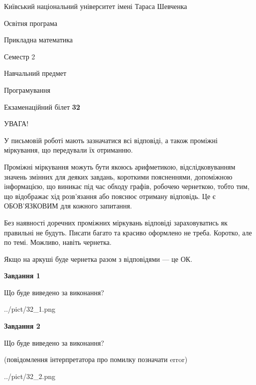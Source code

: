 \documentclass[12pt, ukrainian]{article}
\begin{document}
{{\begin {small}\par
{ \center  Київський національний університет імені Тараса Шевченка \par}
{\parbox {5 cm}{Освітня програма \hfill}{\parbox {7 cm}{Прикладна математика\hfill}}\parbox {6 cm}{\hfill Семестр 2}}\par
{\parbox {5 cm} {Навчальний предмет \hfill}\parbox {7 cm}{Програмування \hfill}\parbox {6cm}{\hfill}\par}\vspace{-7pt} \end{small}}{\center Екзаменаційний білет \No \textbf
{ 32 }\par}}
{
\begin {large}
УВАГА!

У письмовій роботі мають зазначатися всі відповіді, а також проміжні міркування, що передували їх отриманню.

Проміжні міркування можуть бути якоюсь арифметикою, відслідковуванням зна\-чень змінних для деяких завдань,
короткими поясненнями, допоміжною інформацією, що виникає під час обходу графів, робочею чернеткою,
тобто тим, що відображає хід розв’язання або пояснює отриману відповідь.
Це є ОБОВ’ЯЗКОВИМ для кожного запитання.

Без наявності доречних проміжних міркувань відповіді зараховуватись як правиль\-ні не будуть.
Писати багато та красиво оформлено не треба. Коротко, але по темі. Можли\-во, навіть чернетка.

Якщо на аркуші буде чернетка разом з відповідями --- це ОК.

\newpage

{\begin {center}\textbf{Завдання 1}\end {center}}\par
Що буде виведено за виконання?\par
\begin{center}
	{../pict/32_1.png}
\end{center}
\newpage

{\begin {center}\textbf{Завдання 2}\end {center}}\par
Що буде виведено за виконання?\par
 (повідомлення інтерпретатора про помилку позначати error)\par
\begin{center}
	{../pict/32_2.png}
\end{center}
\newpage


\end{large}}
\end{document}
